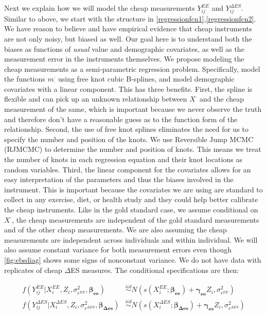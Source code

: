\documentclass[11pt]{article}\usepackage[]{graphicx}\usepackage[]{color}
\begin{document}
Next we explain how we will model the cheap measurements $Y_{ij}^{EE}$ and $Y_{ij}^{\Delta ES}$. Similar to above, we start with the structure in \eqref{regressionfcn1},\eqref{regressionfcn2}. We have reason to believe and have empirical evidence that cheap instruments are not only noisy, but biased as well. Our goal here is to understand both the biases as functions of \emph{usual} value and demographic covariates, as well as the measurement error in the instruments themselves. We propose modeling the cheap measurements as a semi-parametric regression problem. Specifically, model the functions $m_{\cdot}^{\cdot}$ using free knot cubic B-splines, and model demographic covariates with a linear component. This has three benefits. First, the spline is flexible and can pick up an unknown relationship between $X^{\cdot}$ and the cheap measurement of the same, which is important because we never observe the truth and therefore don't have a reasonable guess as to the function form of the relationship. Second, the use of free knot splines eliminates the need for us to specify the number and position of the knots. We use Reversible Jump MCMC (RJMCMC) to determine the number and position of knots. This means we treat the number of knots in each regression equation and their knot locations as random variables.  Third, the linear component for the covariates allows for an easy interpretation of the parameters and thus the biases involved in the instrument. This is important because the covariates we are using are standard to collect in any exercise, diet, or health study and they could help better calibrate the cheap instruments. Like in the gold standard case, we assume conditional on $X^{\cdot}$, the cheap measurements are independent of the gold standard measurements and of the other cheap measurements. We are also assuming the cheap measurements are independent across individuals and within individual. We will also assume constant variance for both measurement errors even though \eqref{fig:ebsdiag} shows some signs of nonconstant variance. We do not have data with replicates of cheap $\Delta$ES measures.   The conditional specifications are then:

\begin{align}
  f(Y_{ij}^{EE}|X_i^{EE},Z_i,\sigma_{\epsilon^{EE}}^2,\boldsymbol{\beta_{ee}}) &\overset{iid}{\sim} N(s(X_i^{EE};\boldsymbol{\beta_{ee}}) + \boldsymbol{\gamma_{ee}}Z_i,\sigma_{\epsilon^{EE}}^2) \\
    f(Y_{ij}^{\Delta ES}|X_i^{\Delta ES},Z_i,\sigma_{\epsilon^{\Delta ES}}^2,\boldsymbol{\beta_{\Delta es}}) &\overset{iid}{\sim} N(s(X_i^{\Delta ES};\boldsymbol{\beta_{\Delta es}}) + \boldsymbol{\gamma_{es}}Z_i,\sigma_{\epsilon^{\Delta ES}}^2) \\
\end{align}
\end{document}
